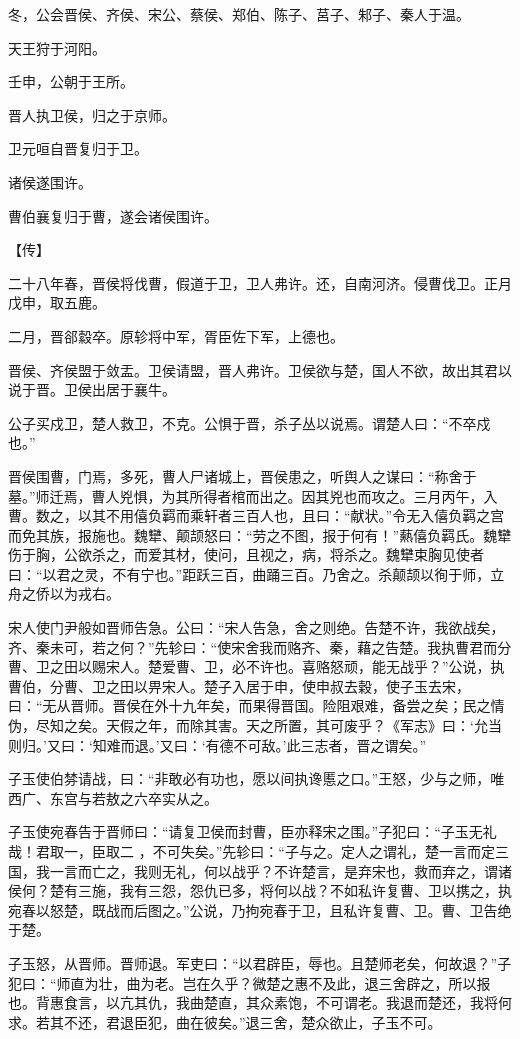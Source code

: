 \documentclass[a4paper,12pt,UTF8,twoside]{ctexbook}
\begin{document}
冬，公会晋侯、齐侯、宋公、蔡侯、郑伯、陈子、莒子、邾子、秦人于温。

天王狩于河阳。

壬申，公朝于王所。

晋人执卫侯，归之于京师。

卫元咺自晋复归于卫。

诸侯遂围许。

曹伯襄复归于曹，遂会诸侯围许。

【传】

二十八年春，晋侯将伐曹，假道于卫，卫人弗许。还，自南河济。侵曹伐卫。正月戊申，取五鹿。

二月，晋郤縠卒。原轸将中军，胥臣佐下军，上德也。

晋侯、齐侯盟于敛盂。卫侯请盟，晋人弗许。卫侯欲与楚，国人不欲，故出其君以说于晋。卫侯出居于襄牛。

公子买戍卫，楚人救卫，不克。公惧于晋，杀子丛以说焉。谓楚人曰：“不卒戍也。”

晋侯围曹，门焉，多死，曹人尸诸城上，晋侯患之，听舆人之谋曰：“称舍于墓。”师迁焉，曹人兇惧，为其所得者棺而出之。因其兇也而攻之。三月丙午，入曹。数之，以其不用僖负羁而乘轩者三百人也，且曰：“献状。”令无入僖负羁之宫而免其族，报施也。魏犫、颠颉怒曰：“劳之不图，报于何有！”爇僖负羁氏。魏犫伤于胸，公欲杀之，而爱其材，使问，且视之，病，将杀之。魏犫束胸见使者曰：“以君之灵，不有宁也。”距跃三百，曲踊三百。乃舍之。杀颠颉以徇于师，立舟之侨以为戎右。

宋人使门尹般如晋师告急。公曰：“宋人告急，舍之则绝。告楚不许，我欲战矣，齐、秦未可，若之何？”先轸曰：“使宋舍我而赂齐、秦，藉之告楚。我执曹君而分曹、卫之田以赐宋人。楚爱曹、卫，必不许也。喜赂怒顽，能无战乎？”公说，执曹伯，分曹、卫之田以畀宋人。楚子入居于申，使申叔去穀，使子玉去宋，曰：“无从晋师。晋侯在外十九年矣，而果得晋国。险阻艰难，备尝之矣；民之情伪，尽知之矣。天假之年，而除其害。天之所置，其可废乎？《军志》曰：‘允当则归。’又曰：‘知难而退。’又曰：‘有德不可敌。’此三志者，晋之谓矣。”

子玉使伯棼请战，曰：“非敢必有功也，愿以间执谗慝之口。”王怒，少与之师，唯西广、东宫与若敖之六卒实从之。

子玉使宛春告于晋师曰：“请复卫侯而封曹，臣亦释宋之围。”子犯曰：“子玉无礼哉！君取一，臣取二 ，不可失矣。”先轸曰：“子与之。定人之谓礼，楚一言而定三国，我一言而亡之，我则无礼，何以战乎？不许楚言，是弃宋也，救而弃之，谓诸侯何？楚有三施，我有三怨，怨仇已多，将何以战？不如私许复曹、卫以携之，执宛春以怒楚，既战而后图之。”公说，乃拘宛春于卫，且私许复曹、卫。曹、卫告绝于楚。

子玉怒，从晋师。晋师退。军吏曰：“以君辟臣，辱也。且楚师老矣，何故退？”子犯曰：“师直为壮，曲为老。岂在久乎？微楚之惠不及此，退三舍辟之，所以报也。背惠食言，以亢其仇，我曲楚直，其众素饱，不可谓老。我退而楚还，我将何求。若其不还，君退臣犯，曲在彼矣。”退三舍，楚众欲止，子玉不可。
\end{document}
